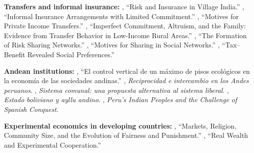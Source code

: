 \documentclass[../structural_economics_book.tex]{subfiles}
\begin{document}
\textbf{Transfers and informal insurance:} \citet{townsend1994risk}, ``Risk and Insurance in Village India.'' \citet{ligon2002informal}, ``Informal Insurance Arrangements with Limited Commitment.'' \citet{cox1987motives}, ``Motives for Private Income Transfers.'' \citet{foster2001imperfect}, ``Imperfect Commitment, Altruism, and the Family: Evidence from Transfer Behavior in Low-Income Rural Areas.'' \citet{fafchamps2007formation}, ``The Formation of Risk Sharing Networks.'' \citet{ligon2012motives}, ``Motives for Sharing in Social Networks.'' \citet{bourguignon2012tax}, ``Tax--Benefit Revealed Social Preferences.''

\textbf{Andean institutions:} \citet{murra1972control}, ``El control vertical de un m\'{a}ximo de pisos ecol\'{o}gicos en la econom\'{i}a de las sociedades andinas.'' \citet{alberti1974reciprocidad}, \textit{Reciprocidad e intercambio en los Andes peruanos}. \citet{patzipaco2004sistema}, \textit{Sistema comunal: una propuesta alternativa al sistema liberal}. \citet{platt1982estado}, \textit{Estado boliviano y ayllu andino}. \citet{stern1982peru}, \textit{Peru's Indian Peoples and the Challenge of Spanish Conquest}.

\textbf{Experimental economics in developing countries:} \citet{henrich2010markets}, ``Markets, Religion, Community Size, and the Evolution of Fairness and Punishment.'' \citet{cardenas2003real}, ``Real Wealth and Experimental Cooperation.''
\end{document}

